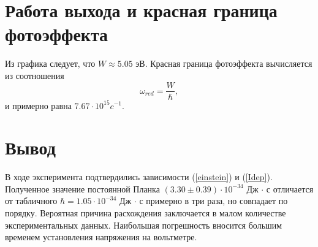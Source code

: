 \documentclass[12pt,a4paper]{article}
\begin{document}
\begin{enumerate}
\begin{figure}[h]
\end{figure}

\end{enumerate}

\section{Работа выхода и красная граница фотоэффекта}

Из графика следует, что $W \approx 5.05$ эВ. Красная граница фотоэффекта вычисляется из соотношения
\begin{equation}
\omega_{red} = \frac{W}{\hbar},
\end{equation}
и примерно равна $7.67 \cdot 10^{15} c^{-1}$.
\section{Вывод}

В ходе эксперимента подтвердились зависимости (\ref{einstein}) и (\ref{Idep}). Полученное значение постоянной Планка $(3.30  \pm 0.39 )\cdot 10^{-34}$ Дж $\cdot$ с отличается от табличного $\hbar = 1.05 \cdot 10^{-34}$ Дж $\cdot$ с примерно в три раза, но совпадает по порядку. Вероятная причина расхождения заключается в малом количестве экспериментальных данных. Наибольшая погрешность вносится большим временем установления напряжения на вольтметре.
\end{document}
